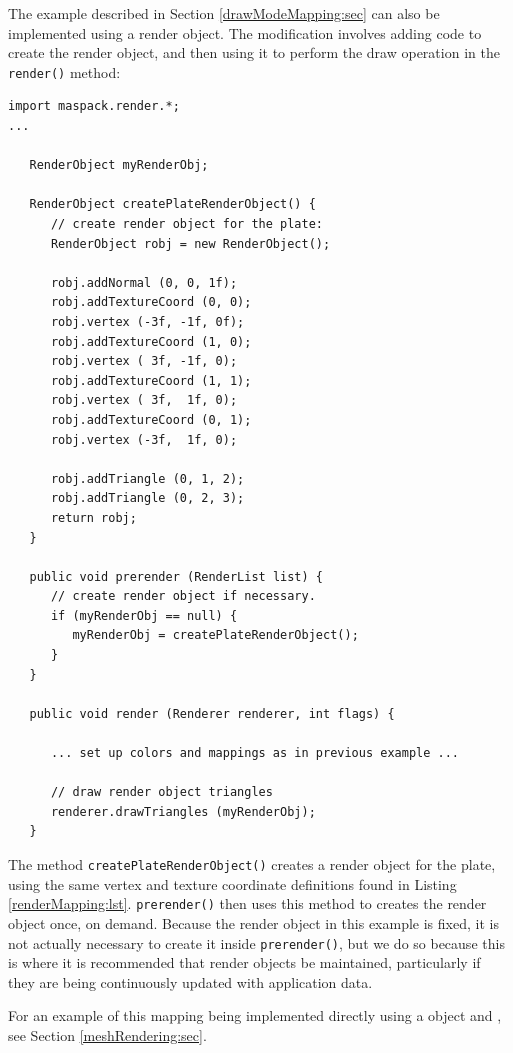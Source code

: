 The example described in Section \ref{drawModeMapping:sec} can also be
implemented using a render object. The modification involves adding
code to create the render object, and then using it to perform the
draw operation in the {\tt render()} method:
%
\begin{lstlisting}[]
import maspack.render.*;
...

   RenderObject myRenderObj;

   RenderObject createPlateRenderObject() {
      // create render object for the plate:
      RenderObject robj = new RenderObject();

      robj.addNormal (0, 0, 1f);
      robj.addTextureCoord (0, 0);
      robj.vertex (-3f, -1f, 0f);
      robj.addTextureCoord (1, 0);
      robj.vertex ( 3f, -1f, 0);
      robj.addTextureCoord (1, 1);
      robj.vertex ( 3f,  1f, 0);
      robj.addTextureCoord (0, 1);
      robj.vertex (-3f,  1f, 0);

      robj.addTriangle (0, 1, 2);
      robj.addTriangle (0, 2, 3);
      return robj;
   }

   public void prerender (RenderList list) {
      // create render object if necessary. 
      if (myRenderObj == null) {
         myRenderObj = createPlateRenderObject();
      }
   }           

   public void render (Renderer renderer, int flags) {

      ... set up colors and mappings as in previous example ...

      // draw render object triangles
      renderer.drawTriangles (myRenderObj);
   }
\end{lstlisting}
%
The method {\tt createPlateRenderObject()} creates a render object for
the plate, using the same vertex and texture coordinate definitions
found in Listing \ref{renderMapping:lst}. {\tt prerender()} then uses
this method to creates the render object once, on demand.  Because the
render object in this example is fixed, it is not actually necessary
to create it inside {\tt prerender()}, but we do so because this is
where it is recommended that render objects be maintained,
particularly if they are being continuously updated with application
data.

\begin{sideblock}
For an example of this mapping being implemented directly using a
 object
and 
,
see Section \ref{meshRendering:sec}.
\end{sideblock}


